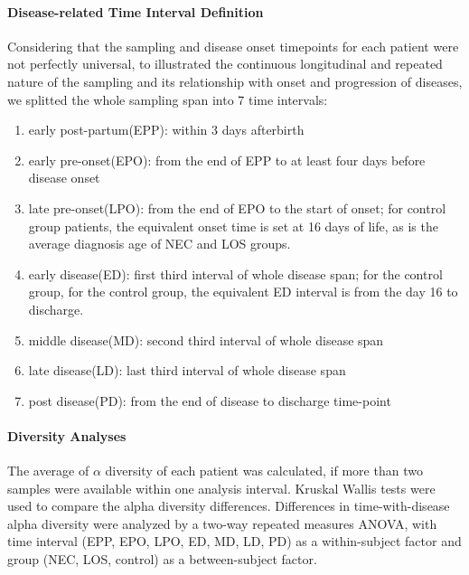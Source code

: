 \documentclass[fleqn,10pt]{wlpeerj} %
\begin{document}
      \paragraph*{Disease-related Time Interval Definition}
      Considering that the sampling and disease onset timepoints for each patient were not perfectly universal, to illustrated the continuous longitudinal and repeated nature of the sampling and its relationship with onset and progression of diseases, we splitted the whole sampling span into 7 time intervals:
        \begin{enumerate}[noitemsep]
          \item early post-partum(EPP): within 3 days afterbirth
          \item early pre-onset(EPO): from the end of EPP to at least four days before disease onset
          \item late pre-onset(LPO): from the end of EPO to the start of onset; for control group patients, the equivalent onset time is set at 16 days of life, as is the average diagnosis age of NEC and LOS groups.
          \item early disease(ED): first third interval of whole disease span; for the control group, for the control group, the equivalent ED interval is from the day 16  to discharge.
          \item middle disease(MD): second third interval of whole disease span
          \item late disease(LD): last third interval of whole disease span
          \item post disease(PD): from the end of disease to discharge time-point
        \end{enumerate}

      \paragraph{Diversity Analyses}
      The average of $\alpha$  diversity of each patient was calculated, if more than two samples were available within one analysis interval. Kruskal Wallis tests were used to compare the alpha diversity differences.   Differences in time-with-disease alpha diversity were analyzed by a two-way repeated measures ANOVA, with time interval (EPP, EPO, LPO, ED, MD, LD, PD) as a within-subject factor and group (NEC, LOS, control) as a between-subject factor.
\end{document}
